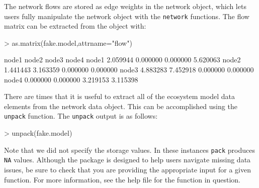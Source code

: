 \documentclass[article]{jss}
\begin{document}
The network flows are stored as edge weights in the network object,
which lets users fully manipulate the network object with the
\texttt{network} functions.  The flow matrix can be extracted from the
object with:

\begin{Schunk}
\begin{Sinput}
> as.matrix(fake.model,attrname="flow")
\end{Sinput}
\begin{Soutput}
         node1    node2    node3    node4
node1 2.059944 0.000000 0.000000 5.620063
node2 1.441443 3.163359 0.000000 0.000000
node3 4.883283 7.452918 0.000000 0.000000
node4 0.000000 0.000000 3.219153 3.115398
\end{Soutput}
\end{Schunk}

There are times that it is useful to extract all of the ecosystem
model data elements from the network data object.  This can be
accomplished using the \texttt{unpack} function. The \texttt{unpack}
output is as follows:

\begin{Schunk}
\begin{Sinput}
> unpack(fake.model)
\end{Sinput}
\end{Schunk}

Note that we did not specify the storage values. In these instances
\texttt{pack} produces \texttt{NA} values. Although the package is
designed to help users navigate missing data issues, be sure to check
that you are providing the appropriate input for a given function. For
more information, see the help file for the function in question.


\end{document}
